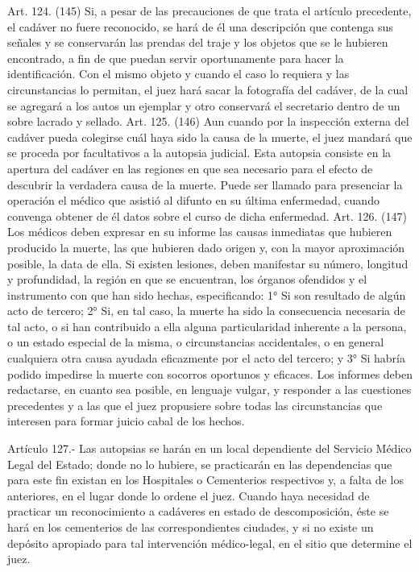     Art. 124. (145) Si, a pesar de las precauciones de que trata el artículo precedente, el cadáver no fuere reconocido, se hará de él una descripción que contenga sus señales y se conservarán las prendas del traje y los objetos que se le hubieren encontrado, a fin de que puedan servir oportunamente para hacer la identificación. Con el mismo objeto y cuando el caso lo requiera y las circunstancias lo permitan, el juez hará sacar la fotografía del cadáver, de la cual se agregará a los autos un ejemplar y otro conservará el secretario dentro de un sobre lacrado y sellado.
    Art. 125. (146) Aun cuando por la inspección externa del cadáver pueda colegirse cuál haya sido la causa de la muerte, el juez mandará que se proceda por facultativos a la autopsia judicial.
    Esta autopsia consiste en la apertura del cadáver en las regiones en que sea necesario para el efecto de descubrir la verdadera causa de la muerte.
    Puede ser llamado para presenciar la operación el médico que asistió al difunto en su última enfermedad, cuando convenga obtener de él datos sobre el curso de dicha enfermedad.
    Art. 126. (147) Los médicos deben expresar en su informe las causas inmediatas que hubieren producido la muerte, las que hubieren dado origen y, con la mayor aproximación posible, la data de ella.
    Si existen lesiones, deben manifestar su número, longitud y profundidad, la región en que se encuentran, los órganos ofendidos y el instrumento con que han sido hechas, especificando:
    1° Si son resultado de algún acto de tercero;
    2° Si, en tal caso, la muerte ha sido la consecuencia necesaria de tal acto, o si han contribuido a ella alguna particularidad inherente a la persona, o un estado especial de la misma, o circunstancias accidentales, o en general cualquiera otra causa ayudada eficazmente por el acto del tercero; y
    3° Si habría podido impedirse la muerte con socorros oportunos y eficaces.
    Los informes deben redactarse, en cuanto sea posible, en lenguaje vulgar, y responder a las cuestiones precedentes y a las que el juez propusiere sobre todas las circunstancias que interesen para formar juicio cabal de los hechos.

    Artículo 127.- Las autopsias se harán en un local dependiente del Servicio Médico Legal del Estado; donde no lo hubiere, se practicarán en las dependencias que para este fin existan en los Hospitales o Cementerios respectivos y, a falta de los anteriores, en el lugar donde lo ordene el juez.
    Cuando haya necesidad de practicar un reconocimiento a cadáveres en estado de descomposición, éste se hará en los cementerios de las correspondientes ciudades, y si no existe un depósito apropiado para tal intervención médico-legal, en el sitio que determine el juez.

